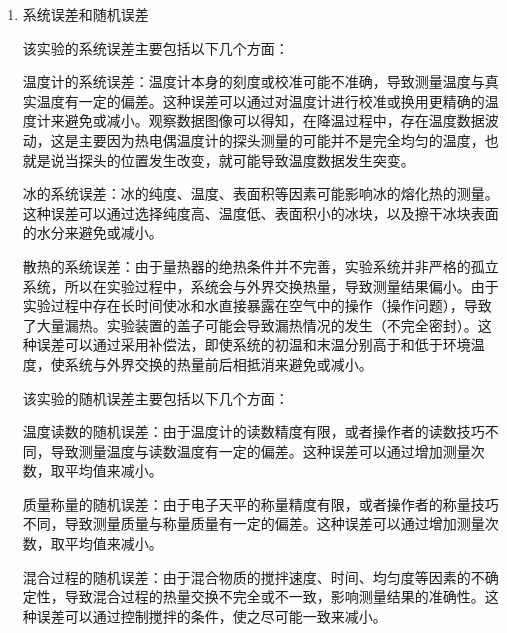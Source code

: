 \documentclass[dvipsnames, svgnames,a4paper,11pt]{article}
\begin{document}
\begin{enumerate}
		\item 系统误差和随机误差
		
		该实验的系统误差主要包括以下几个方面：
		
		温度计的系统误差：温度计本身的刻度或校准可能不准确，导致测量温度与真实温度有一定的偏差。这种误差可以通过对温度计进行校准或换用更精确的温度计来避免或减小。观察数据图像可以得知，在降温过程中，存在温度数据波动，这是主要因为热电偶温度计的探头测量的可能并不是完全均匀的温度，也就是说当探头的位置发生改变，就可能导致温度数据发生突变。
		
		冰的系统误差：冰的纯度、温度、表面积等因素可能影响冰的熔化热的测量。这种误差可以通过选择纯度高、温度低、表面积小的冰块，以及擦干冰块表面的水分来避免或减小。
		
		散热的系统误差：由于量热器的绝热条件并不完善，实验系统并非严格的孤立系统，所以在实验过程中，系统会与外界交换热量，导致测量结果偏小。由于实验过程中存在长时间使冰和水直接暴露在空气中的操作（操作问题），导致了大量漏热。实验装置的盖子可能会导致漏热情况的发生（不完全密封）。这种误差可以通过采用补偿法，即使系统的初温和末温分别高于和低于环境温度，使系统与外界交换的热量前后相抵消来避免或减小。
		
		该实验的随机误差主要包括以下几个方面：
		
		温度读数的随机误差：由于温度计的读数精度有限，或者操作者的读数技巧不同，导致测量温度与读数温度有一定的偏差。这种误差可以通过增加测量次数，取平均值来减小。
		
		质量称量的随机误差：由于电子天平的称量精度有限，或者操作者的称量技巧不同，导致测量质量与称量质量有一定的偏差。这种误差可以通过增加测量次数，取平均值来减小。
		
		混合过程的随机误差：由于混合物质的搅拌速度、时间、均匀度等因素的不确定性，导致混合过程的热量交换不完全或不一致，影响测量结果的准确性。这种误差可以通过控制搅拌的条件，使之尽可能一致来减小。
	\end{enumerate}
	
\end{document}
